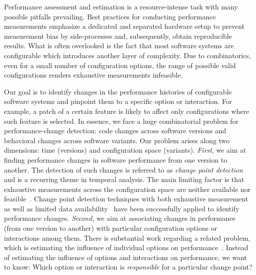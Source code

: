 \documentclass[sigconf]{acmart}
\begin{document}
	Performance assessment and estimation is a resource-intense task with many possible pitfalls prevailing.
	Best practices for conducting performance measurements emphasize a dedicated and separated hardware setup to prevent measurement bias by side-processes and, subsequently, obtain reproducible results.	%
	What is often overlooked is the fact that most software systems are configurable which introduces another layer of complexity.
	Due to combinatorics, even for a small number of configuration options, the range of possible valid configurations renders exhaustive measurements infeasible.

	Our goal is to identify changes in the performance histories of configurable software systems and pinpoint them to a specific option or interaction. For example, a patch of a certain feature is likely to affect only configurations where such feature is selected.
	In essence, we face a huge combinatorial problem for performance-change detection: code changes across software versions and behavioral changes across software variants.
	Our problem arises along two dimensions: time (versions) and configuration space (variants).
	\emph{First}, we aim at finding performance changes in software performance from one version to another.
	The detection of such changes is referred to as \emph{change point detection} and is a recurring theme in temporal analysis.
	The main limiting factor is that exhaustive measurements across the configuration space are neither available nor feasible~\cite{white_selecting_2009}.
	Change point detection techniques with both exhaustive measurement~\cite{cityIdentifying2014,daly_industry_2020} as well as limited data availability~\cite{sandoval_alcocer_learning_2016,alcocer_prioritizing_2020,huang_performance_2014,muhlbauer_accurate_2019} have been successfully applied to identify performance changes.
	\emph{Second}, we aim at associating changes in performance (from one version to another) with particular configuration options or interactions among them.
	There is substantial work  regarding a related problem, which is estimating the influence of individual options on performance~\cite{siegmundPredictingPerformanceAutomated2012,siegmundPerformanceinfluenceModelsHighly2015,sarkarCostEfficientSamplingPerformance,haDeepPerf2019}. Instead of estimating the influence of options and interactions on performance, we want to know: Which option or interaction is \emph{responsible} for a particular change point?
\end{document}
